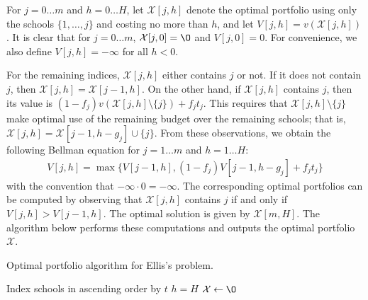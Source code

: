 \documentclass[12pt]{article} %
\newcommand{\lIfElse}[3]{\lIf{#1}{#2 \textbf{else}~#3}}
\theoremstyle{definition}
\theoremstyle{definition}
\begin{document}
For $j = 0 \dots m$ and $h = 0 \dots H$, let $\mathcal{X}[j, h]$ denote the optimal portfolio using only the schools $\{ 1, \dots, j\}$ and costing no more than $h$, and let $V[j,h] = v(\mathcal{X}[j, h])$.  It is clear that for $j = 0\dots m$, $\mathcal{X}[j, 0] = \O$ and $V[j, 0] = 0$.  For convenience, we also define $V[j, h] = -\infty$ for all $h < 0$.

For the remaining indices, $\mathcal{X}[j, h]$ either contains $j$ or not. If it does not contain $j$, then $\mathcal{X}[j, h] = \mathcal{X}[j-1, h]$. On the other hand, if  $\mathcal{X}[j, h]$ contains $j$, then its value is $(1 - f_j) v(\mathcal{X}[j, h]\setminus \{j\}) + f_j t_j$. This requires that $\mathcal{X}[j, h]\setminus \{j\}$ make optimal use of the remaining budget over the remaining schools; that is, $\mathcal{X}[j, h] = \mathcal{X}[j-1, h - g_j] \cup\{j\}$. From these observations, we obtain the following Bellman equation for $ j = 1\dots m$ and $h = 1\dots H$:
\begin{align}
V[j, h] = \max\bigl\{ V[j-1, h], (1 - f_j) V[j-1, h-g_j] + f_j t_j \bigr\}
\end{align}
with the convention that $ -\infty \cdot 0 = -\infty$. The corresponding optimal portfolios can be computed by observing that $\mathcal{X}[j, h]$ contains $j$ if and only if $V[j, h]> V[j-1, h]$. The optimal solution is given by $\mathcal{X}[m, H]$. The algorithm below performs these computations and outputs the optimal portfolio $\mathcal{X}$. 

\begin{algorithm}[H] 
\caption{Optimal portfolio algorithm for Ellis's problem.} \label{algorithmforhetg}
\KwData{Utility values $t \in[0, \infty)^m$, admissions probabilities $f \in [0, 1]^m$, application costs $g \in \mathbb{N}^m$, budget $H \in\mathbb{N}$.}
Index schools in ascending order by $t$\;
$h = H$\;
$\mathcal{X} \gets \O$\;
\end{algorithm}
\end{document}
